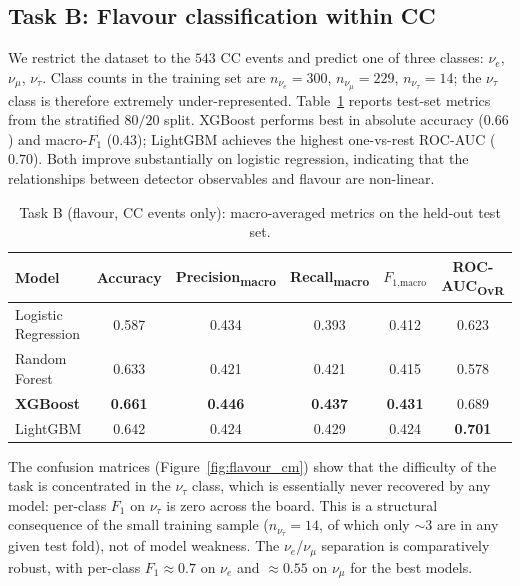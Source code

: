 \documentclass[11pt,a4paper]{article}
\begin{document}
\subsection{Task B: Flavour classification within CC}
\label{sec:flavour}

We restrict the dataset to the $\num{543}$ CC events and predict one of three classes: $\nu_e$, $\nu_\mu$, $\nu_\tau$.  Class counts in the training set are $n_{\nu_e}=300$, $n_{\nu_\mu}=229$, $n_{\nu_\tau}=14$; the $\nu_\tau$ class is therefore extremely under-represented.  Table~\ref{tab:flavour_single} reports test-set metrics from the stratified $80/20$ split.  XGBoost performs best in absolute accuracy ($0.66$) and macro-$F_1$ ($0.43$); LightGBM achieves the highest one-vs-rest ROC-AUC ($0.70$).  Both improve substantially on logistic regression, indicating that the relationships between detector observables and flavour are non-linear.

\begin{table}[ht]
\centering
\small
\begin{tabular}{lccccc}
\toprule
Model & Accuracy & Precision\textsubscript{macro} & Recall\textsubscript{macro} & $F_{1\text{,macro}}$ & ROC-AUC\textsubscript{OvR} \\
\midrule
Logistic Regression & 0.587 & 0.434 & 0.393 & 0.412 & 0.623 \\
Random Forest       & 0.633 & 0.421 & 0.421 & 0.415 & 0.578 \\
\textbf{XGBoost}    & \textbf{0.661} & \textbf{0.446} & \textbf{0.437} & \textbf{0.431} & 0.689 \\
LightGBM            & 0.642 & 0.424 & 0.429 & 0.424 & \textbf{0.701} \\
\bottomrule
\end{tabular}
\caption{Task B (flavour, CC events only): macro-averaged metrics on the held-out test set.}
\label{tab:flavour_single}
\end{table}

The confusion matrices (Figure~\ref{fig:flavour_cm}) show that the difficulty of the task is concentrated in the $\nu_\tau$ class, which is essentially never recovered by any model: per-class $F_1$ on $\nu_\tau$ is zero across the board.  This is a structural consequence of the small training sample ($n_{\nu_\tau}=14$, of which only $\sim3$ are in any given test fold), not of model weakness.  The $\nu_e$/$\nu_\mu$ separation is comparatively robust, with per-class $F_1\approx0.7$ on $\nu_e$ and $\approx0.55$ on $\nu_\mu$ for the best models.
\end{document}
